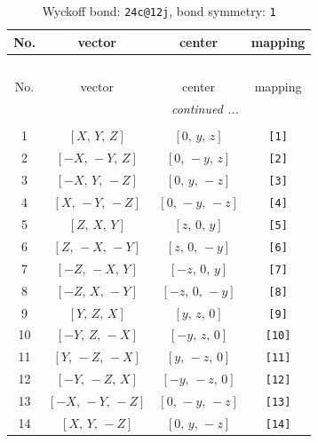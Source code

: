 \documentclass[fleqn,8pt]{jsarticle}
\begin{document}
\begin{longtable}{cccc}
\caption{Wyckoff bond: {\tt 24c@12j}, bond symmetry: {\tt 1}}
 \\
 \hline \hline
No. & vector & center & mapping \\ \hline \endfirsthead

\multicolumn{3}{l}{\tablename\ \thetable{}} \\
 \hline \hline
No. & vector & center & mapping \\ \hline \endhead

 \hline \hline
\multicolumn{3}{r}{\footnotesize\it continued ...} \\ \endfoot

 \hline \hline
\multicolumn{3}{r}{} \\ \endlastfoot

1 & $\left[ X,\, Y,\, Z \right]$ & $\left[ 0,\, y,\, z \right]$ & {\tt [1]} \\ \hline
2 & $\left[ - X,\, - Y,\, Z \right]$ & $\left[ 0,\, - y,\, z \right]$ & {\tt [2]} \\ \hline
3 & $\left[ - X,\, Y,\, - Z \right]$ & $\left[ 0,\, y,\, - z \right]$ & {\tt [3]} \\ \hline
4 & $\left[ X,\, - Y,\, - Z \right]$ & $\left[ 0,\, - y,\, - z \right]$ & {\tt [4]} \\ \hline
5 & $\left[ Z,\, X,\, Y \right]$ & $\left[ z,\, 0,\, y \right]$ & {\tt [5]} \\ \hline
6 & $\left[ Z,\, - X,\, - Y \right]$ & $\left[ z,\, 0,\, - y \right]$ & {\tt [6]} \\ \hline
7 & $\left[ - Z,\, - X,\, Y \right]$ & $\left[ - z,\, 0,\, y \right]$ & {\tt [7]} \\ \hline
8 & $\left[ - Z,\, X,\, - Y \right]$ & $\left[ - z,\, 0,\, - y \right]$ & {\tt [8]} \\ \hline
9 & $\left[ Y,\, Z,\, X \right]$ & $\left[ y,\, z,\, 0 \right]$ & {\tt [9]} \\ \hline
10 & $\left[ - Y,\, Z,\, - X \right]$ & $\left[ - y,\, z,\, 0 \right]$ & {\tt [10]} \\ \hline
11 & $\left[ Y,\, - Z,\, - X \right]$ & $\left[ y,\, - z,\, 0 \right]$ & {\tt [11]} \\ \hline
12 & $\left[ - Y,\, - Z,\, X \right]$ & $\left[ - y,\, - z,\, 0 \right]$ & {\tt [12]} \\ \hline
13 & $\left[ - X,\, - Y,\, - Z \right]$ & $\left[ 0,\, - y,\, - z \right]$ & {\tt [13]} \\ \hline
14 & $\left[ X,\, Y,\, - Z \right]$ & $\left[ 0,\, y,\, - z \right]$ & {\tt [14]} \\ \hline

\end{longtable}
\end{document}
